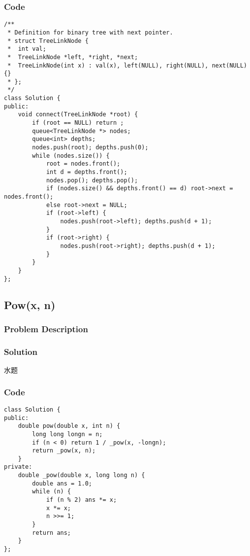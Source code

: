 \documentclass[courier]{article}
\begin{document}
\begin{CJK*}{UTF8}{gkai}
\subsubsection*{Code}
\begin{lstlisting}
/**
 * Definition for binary tree with next pointer.
 * struct TreeLinkNode {
 *  int val;
 *  TreeLinkNode *left, *right, *next;
 *  TreeLinkNode(int x) : val(x), left(NULL), right(NULL), next(NULL) {}
 * };
 */
class Solution {
public:
    void connect(TreeLinkNode *root) {
        if (root == NULL) return ;
        queue<TreeLinkNode *> nodes;
        queue<int> depths;
        nodes.push(root); depths.push(0);
        while (nodes.size()) {
            root = nodes.front();
            int d = depths.front();
            nodes.pop(); depths.pop();
            if (nodes.size() && depths.front() == d) root->next = nodes.front();
            else root->next = NULL;
            if (root->left) {
                nodes.push(root->left); depths.push(d + 1);
            }
            if (root->right) {
                nodes.push(root->right); depths.push(d + 1);
            }
        }
    }
}; 
\end{lstlisting}


\subsection{ Pow(x, n) }

\subsubsection*{Problem Description}


\subsubsection*{Solution}
水题

\subsubsection*{Code}
\begin{lstlisting}
class Solution {
public:
    double pow(double x, int n) {
        long long longn = n;
        if (n < 0) return 1 / _pow(x, -longn);
        return _pow(x, n);
    }
private:
    double _pow(double x, long long n) {
        double ans = 1.0;
        while (n) {
            if (n % 2) ans *= x;
            x *= x;
            n >>= 1;
        }
        return ans;
    }
}; 
\end{lstlisting}



\end{CJK*}
\end{document}
